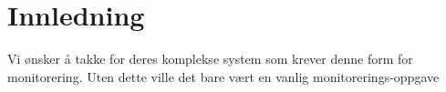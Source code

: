 \chapter*{Innledning} %
\label{chap:preface}

Vi ønsker å takke \TMX for deres komplekse system som krever denne form for monitorering. Uten dette ville det bare vært en vanlig monitorerings-oppgave
 
 